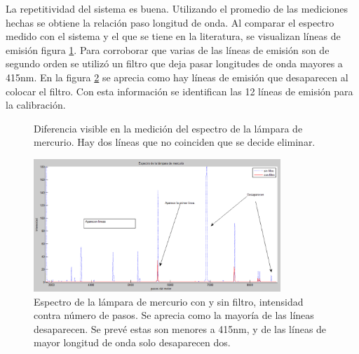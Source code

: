 La repetitividad del sistema es buena. Utilizando el promedio de las mediciones hechas se obtiene la relación paso longitud de onda. Al comparar el espectro medido con el sistema y el que se tiene en la literatura, se visualizan líneas de emisión  figura \ref{fig:espectroCompa}.
Para corroborar que varias de las líneas de emisión son de segundo orden se utilizó un filtro que deja pasar longitudes de onda mayores a 415nm. En la figura \ref{fig:hgfiltro} se aprecia como hay líneas de emisión que desaparecen al colocar el filtro. Con esta información se identifican las 12 líneas de emisión para la calibración.
\begin{figure}[h!]
	\centering
	\caption{Diferencia visible en la medición del espectro de la lámpara de mercurio. Hay dos líneas que no coinciden que se decide eliminar.}
	\label{fig:espectroCompa}
\end{figure}
\begin{figure}[h!]
	\centering
	\includegraphics[width=0.7\linewidth, height=5cm]{Imagenes/3/HgFiltro}
	\caption[Espectro de la lámpara de mercurio con y sin filtro, intensidad contra pasos.]{Espectro de la lámpara de mercurio con y sin filtro, intensidad contra número de pasos. Se aprecia como la mayoría de las líneas desaparecen. Se prevé estas son menores a 415nm, y de las líneas de mayor longitud de onda solo desaparecen dos.}
	\label{fig:hgfiltro}
\end{figure}


